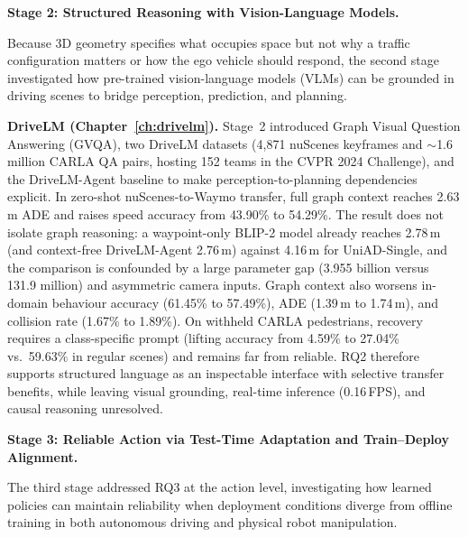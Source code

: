 \medskip
\noindent\textbf{Stage 2: Structured Reasoning with Vision-Language Models.}

Because 3D geometry specifies what occupies space but not why a traffic configuration matters or how the ego vehicle should respond, the second stage investigated how pre-trained vision-language models (VLMs) can be grounded in driving scenes to bridge perception, prediction, and planning.

\textbf{DriveLM (Chapter~\ref{ch:drivelm}).} Stage~2 introduced Graph Visual Question Answering (GVQA), two DriveLM datasets (4,871 nuScenes keyframes and $\sim$1.6 million CARLA QA pairs, hosting 152 teams in the CVPR 2024 Challenge), and the DriveLM-Agent baseline to make perception-to-planning dependencies explicit. In zero-shot nuScenes-to-Waymo transfer, full graph context reaches 2.63\,m ADE and raises speed accuracy from 43.90\% to 54.29\%. The result does not isolate graph reasoning: a waypoint-only BLIP-2 model already reaches 2.78\,m (and context-free DriveLM-Agent 2.76\,m) against 4.16\,m for UniAD-Single, and the comparison is confounded by a large parameter gap (3.955 billion versus 131.9 million) and asymmetric camera inputs. Graph context also worsens in-domain behaviour accuracy (61.45\% to 57.49\%), ADE (1.39\,m to 1.74\,m), and collision rate (1.67\% to 1.89\%). On withheld CARLA pedestrians, recovery requires a class-specific prompt (lifting accuracy from 4.59\% to 27.04\% vs.\ 59.63\% in regular scenes) and remains far from reliable. RQ2 therefore supports structured language as an inspectable interface with selective transfer benefits, while leaving visual grounding, real-time inference (0.16\,FPS), and causal reasoning unresolved.

\medskip
\noindent\textbf{Stage 3: Reliable Action via Test-Time Adaptation and Train--Deploy Alignment.}

The third stage addressed RQ3 at the action level, investigating how learned policies can maintain reliability when deployment conditions diverge from offline training in both autonomous driving and physical robot manipulation.

